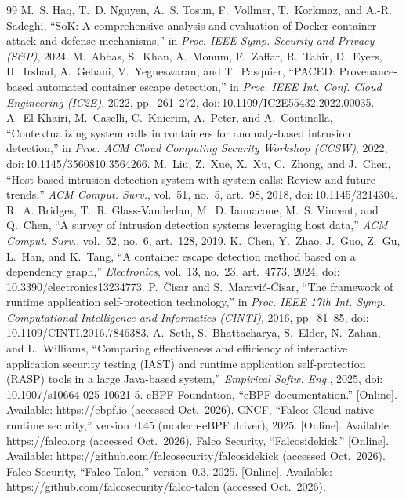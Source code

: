 \documentclass[10pt,conference]{IEEEtran}
\begin{document}
\begin{thebibliography}{99}
 M.~S. Haq, T.~D. Nguyen, A.~S. Tosun, F.~Vollmer, T.~Korkmaz, and A.-R. Sadeghi, ``SoK: A comprehensive analysis and evaluation of Docker container attack and defense mechanisms,'' in \emph{Proc. IEEE Symp. Security and Privacy (S\&P)}, 2024.
 M.~Abbas, S.~Khan, A.~Monum, F.~Zaffar, R.~Tahir, D.~Eyers, H.~Irshad, A.~Gehani, V.~Yegneswaran, and T.~Pasquier, ``PACED: Provenance-based automated container escape detection,'' in \emph{Proc. IEEE Int. Conf. Cloud Engineering (IC2E)}, 2022, pp.~261--272, doi:\,10.1109/IC2E55432.2022.00035.
 A.~El Khairi, M.~Caselli, C.~Knierim, A.~Peter, and A.~Continella, ``Contextualizing system calls in containers for anomaly-based intrusion detection,'' in \emph{Proc. ACM Cloud Computing Security Workshop (CCSW)}, 2022, doi:\,10.1145/3560810.3564266.
 M.~Liu, Z.~Xue, X.~Xu, C.~Zhong, and J.~Chen, ``Host-based intrusion detection system with system calls: Review and future trends,'' \emph{ACM Comput. Surv.}, vol.~51, no.~5, art.~98, 2018, doi:\,10.1145/3214304.
 R.~A. Bridges, T.~R. Glass-Vanderlan, M.~D. Iannacone, M.~S. Vincent, and Q.~Chen, ``A survey of intrusion detection systems leveraging host data,'' \emph{ACM Comput. Surv.}, vol.~52, no.~6, art.~128, 2019.
 K.~Chen, Y.~Zhao, J.~Guo, Z.~Gu, L.~Han, and K.~Tang, ``A container escape detection method based on a dependency graph,'' \emph{Electronics}, vol.~13, no.~23, art.~4773, 2024, doi:\,10.3390/electronics13234773.
 P.~\v{C}isar and S.~Maravi\'{c}-\v{C}isar, ``The framework of runtime application self-protection technology,'' in \emph{Proc. IEEE 17th Int. Symp. Computational Intelligence and Informatics (CINTI)}, 2016, pp.~81--85, doi:\,10.1109/CINTI.2016.7846383.
 A.~Seth, S.~Bhattacharya, S.~Elder, N.~Zahan, and L.~Williams, ``Comparing effectiveness and efficiency of interactive application security testing (IAST) and runtime application self-protection (RASP) tools in a large Java-based system,'' \emph{Empirical Softw. Eng.}, 2025, doi:\,10.1007/s10664-025-10621-5.
 eBPF Foundation, ``eBPF documentation.'' [Online]. Available: https://ebpf.io (accessed Oct.~2026).
 CNCF, ``Falco: Cloud native runtime security,'' version~0.45 (modern-eBPF driver), 2025. [Online]. Available: https://falco.org (accessed Oct.~2026).
 Falco Security, ``Falcosidekick.'' [Online]. Available: https://github.com/falcosecurity/falcosidekick (accessed Oct.~2026).
 Falco Security, ``Falco Talon,'' version~0.3, 2025. [Online]. Available: https://github.com/falcosecurity/falco-talon (accessed Oct.~2026).

\end{thebibliography}
\end{document}
